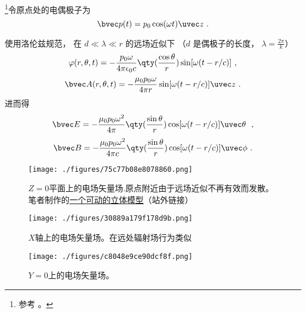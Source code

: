 
\begin{issues}
\issueDraft
\end{issues}


\footnote{参考 \cite{GriffE}。}令原点处的电偶极子为
\begin{equation}
\bvec p(t) = p_0 \cos(\omega t) \uvec z~.
\end{equation}

使用洛伦兹规范， 在 $d \ll \lambda \ll r$ 的远场近似下 （$d$ 是偶极子的长度， $\lambda = \frac{2\pi}{k}$）
\begin{equation}
\varphi(r, \theta, t) = -\frac{p_0\omega}{4\pi\epsilon_0 c} \qty(\frac{\cos\theta}{r}) \sin[\omega(t - r/c)]~,
\end{equation}
\begin{equation}
\bvec A(r, \theta, t) = -\frac{\mu_0 p_0 \omega}{4\pi r} \sin[\omega(t - r/c)]\uvec z~.
\end{equation}
进而得
\begin{equation}
\bvec E = -\frac{\mu_0 p_0\omega^2}{4\pi} \qty(\frac{\sin\theta}{r})\cos[\omega(t - r/c)]\uvec \theta~~,
\end{equation}
\begin{equation}
\bvec B = -\frac{\mu_0 p_0\omega^2}{4\pi c} \qty(\frac{\sin\theta}{r})\cos[\omega(t - r/c)]\uvec \phi~.
\end{equation}

\begin{figure}[ht]
\centering
\texttt{[image: ./figures/75c77b08e8078860.png]}
\caption{$Z=0$平面上的电场矢量场.原点附近由于远场近似不再有效而发散。笔者制作的\href{https://www.geogebra.org/m/xnputtwr}{一个可动的立体模型}（站外链接）} \label{fig_DipRad_4}
\end{figure}

\begin{figure}[ht]
\centering
\texttt{[image: ./figures/30889a179f178d9b.png]}
\caption{$X$轴上的电场矢量场。在远处辐射场行为类似 } \label{fig_DipRad_1}
\end{figure}

\begin{figure}[ht]
\centering
\texttt{[image: ./figures/c8048e9ce90dcf8f.png]}
\caption{$Y=0$上的电场矢量场。} \label{fig_DipRad_3}
\end{figure}
